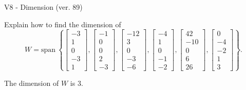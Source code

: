 \begin{exercise}
  \begin{exerciseTitle}V8 - Dimension (ver. 89)\end{exerciseTitle}
  \begin{exerciseStatement}
    Explain how to find the dimension of 
\[W=\mathrm{span}\ \left\{\left[\begin{array}{r}
-3 \\
1 \\
0 \\
-3 \\
1
\end{array}\right] , \left[\begin{array}{r}
-1 \\
0 \\
0 \\
2 \\
-3
\end{array}\right] , \left[\begin{array}{r}
-12 \\
3 \\
0 \\
-3 \\
-6
\end{array}\right] , \left[\begin{array}{r}
-4 \\
1 \\
0 \\
-1 \\
-2
\end{array}\right] , \left[\begin{array}{r}
42 \\
-10 \\
0 \\
6 \\
26
\end{array}\right] , \left[\begin{array}{r}
0 \\
-4 \\
-2 \\
1 \\
3
\end{array}\right]\right\}.\]



  \end{exerciseStatement}
  \begin{exerciseAnswer}
   The dimension of \(W\) is  \(3\).
  


  \end{exerciseAnswer}
\end{exercise}